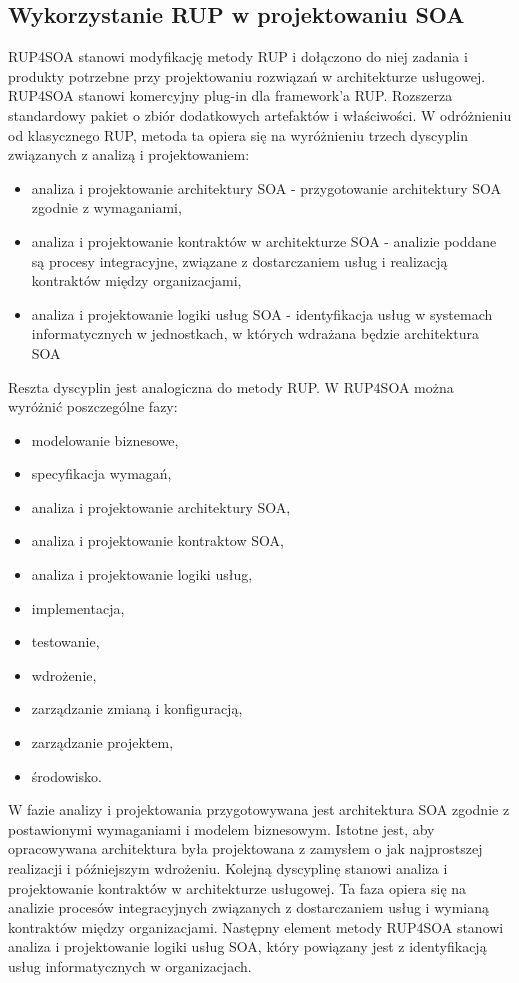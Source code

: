 \subsection{Wykorzystanie RUP w projektowaniu SOA}
RUP4SOA stanowi modyfikację metody RUP i dołączono do niej zadania i produkty potrzebne przy projektowaniu rozwiązań w architekturze usługowej. RUP4SOA stanowi komercyjny plug-in dla framework'a RUP. Rozszerza standardowy pakiet o zbiór dodatkowych artefaktów i właściwości. W odróżnieniu od klasycznego RUP, metoda ta opiera się na wyróżnieniu trzech dyscyplin związanych z analizą i projektowaniem:
\begin{itemize}
\item{analiza i projektowanie architektury SOA - przygotowanie architektury SOA zgodnie z wymaganiami,}
\item{analiza i projektowanie kontraktów w architekturze SOA - analizie poddane są procesy integracyjne, związane z dostarczaniem usług i realizacją kontraktów między organizacjami,}
\item{analiza i projektowanie logiki usług SOA - identyfikacja usług w systemach informatycznych w jednostkach, w których wdrażana będzie architektura SOA}
\end{itemize}
Reszta dyscyplin jest analogiczna do metody RUP. \cite{PlatIntGor} W RUP4SOA można wyróżnić poszczególne fazy:
\begin{itemize}
\item {modelowanie biznesowe,}
\item {specyfikacja wymagań,}
\item {analiza i projektowanie architektury SOA,}
\item {analiza i projektowanie kontraktow SOA,}
\item {analiza i projektowanie logiki usług,}
\item {implementacja,}
\item {testowanie,}
\item {wdrożenie,}
\item {zarządzanie zmianą i konfiguracją,}
\item {zarządzanie projektem,}
\item {środowisko.}
\end{itemize}

W fazie analizy i projektowania przygotowywana jest architektura SOA zgodnie z postawionymi wymaganiami i modelem biznesowym. Istotne jest, aby opracowywana architektura była projektowana z zamysłem o jak najprostszej realizacji i późniejszym wdrożeniu. Kolejną dyscyplinę stanowi analiza i projektowanie kontraktów w architekturze usługowej. Ta faza opiera się na analizie procesów integracyjnych związanych z dostarczaniem usług i wymianą kontraktów między organizacjami. Następny element metody RUP4SOA stanowi analiza i projektowanie logiki usług SOA, który powiązany jest z identyfikacją usług informatycznych w organizacjach. 

